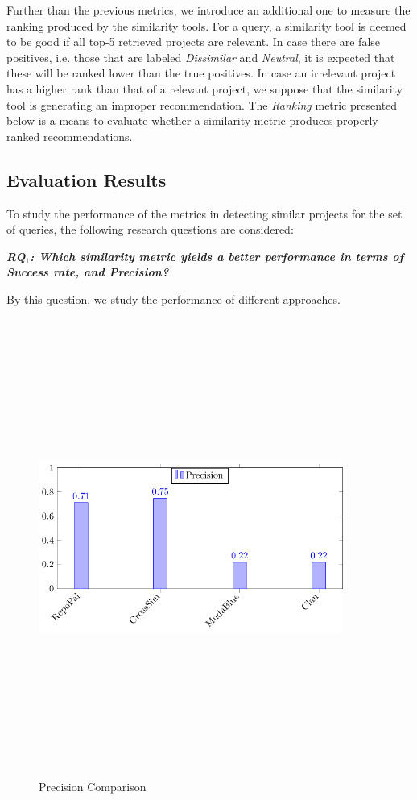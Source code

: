 Further than the previous metrics, we introduce an additional one to measure the ranking produced by the similarity tools. For a query, a similarity tool is deemed to be good if all top-5 retrieved projects are relevant. In case there are false positives, i.e. those that are labeled \emph{Dissimilar} and \emph{Neutral}, it is expected that these will be ranked lower than the true positives. In case an irrelevant project has a higher rank than that of a relevant project, we suppose that the similarity tool is generating an improper recommendation. The \emph{Ranking} metric presented below is a means to evaluate whether a similarity metric produces properly ranked recommendations. 

\newpage
\subsection{Evaluation Results}
To study the performance of the metrics in detecting similar projects for the set of queries, the following research questions are considered:

\newcommand{\rqfirst}{RQ$_1$: Which similarity metric yields a better performance in terms of Success rate, and Precision?}\textit{\textbf{\rqfirst}} %

By this question, we study the performance of different approaches.

\begin{figure}[H]
\includegraphics[width=10cm,height=15cm,keepaspectratio]{images/Precision.pdf}
\centering
\caption{Precision Comparison}
\label{fig:PrecisionC}
\end{figure}

